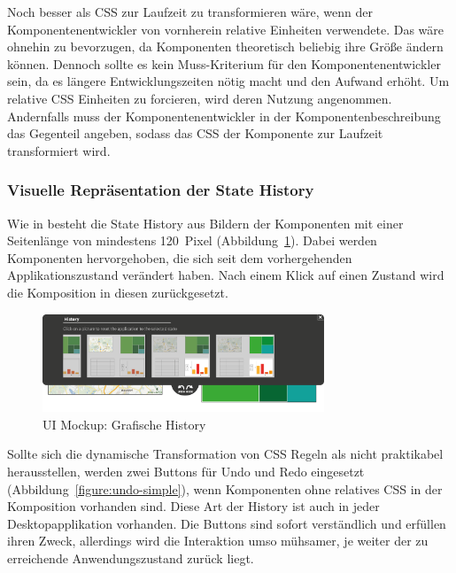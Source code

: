 \documentclass[
	headsepline,
	footsepline,
	fontsize=12pt,
	bibliography=totoc
]{scrbook}
\begin{document}

Noch besser als CSS zur Laufzeit zu transformieren wäre, wenn der Komponentenentwickler von vornherein relative Einheiten verwendete. Das wäre ohnehin zu bevorzugen, da Komponenten theoretisch beliebig ihre Größe ändern können. Dennoch sollte es kein Muss-Kriterium für den Komponentenentwickler sein, da es längere Entwicklungszeiten nötig macht und den Aufwand erhöht. Um  relative CSS Einheiten zu forcieren, wird deren Nutzung angenommen. Andernfalls muss der Komponentenentwickler in der Komponentenbeschreibung das Gegenteil angeben, sodass das CSS der Komponente zur Laufzeit transformiert wird.

\subsubsection{Visuelle Repräsentation der State History}


Wie in \cite{Heer2008} besteht die State History aus Bildern der Komponenten mit einer Seitenlänge von mindestens 120~Pixel (Abbildung~\ref{figure:undo-graphical}). Dabei werden Komponenten hervorgehoben, die sich seit dem vorhergehenden Applikationszustand verändert haben. Nach einem Klick auf einen Zustand wird die Komposition in diesen zurückgesetzt.

\begin{figure}[htbp]
   \centering
   \includegraphics[width=0.75\textwidth]{images/konzeption-undo-graphical.png}
   \caption{UI Mockup: Grafische History}
   \label{figure:undo-graphical}
\end{figure}


Sollte sich die dynamische Transformation von CSS Regeln als nicht praktikabel herausstellen, werden zwei Buttons für Undo und Redo eingesetzt (Abbildung~\ref{figure:undo-simple}), wenn Komponenten ohne relatives CSS in der Komposition vorhanden sind. Diese Art der History ist auch in jeder Desktopapplikation vorhanden. Die Buttons sind sofort verständlich und erfüllen ihren Zweck, allerdings wird die Interaktion umso mühsamer, je weiter der zu erreichende Anwendungszustand zurück liegt.
\end{document}
